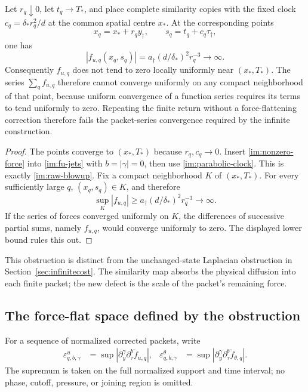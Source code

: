 \begin{proposition}\label{im:raw-obstruction}
Let $r_q\downarrow0$, let $t_q\to T_*$, and place complete similarity
copies with the fixed clock
$c_q=\delta_*r_q^2/d$ at the common spatial centre $x_*$.  At the
corresponding points
\[
 x_q=x_*+r_qy_\dagger,\qquad
 s_q=t_q+c_q\tau_\dagger,
\]
one has
\begin{equation}\label{im:raw-blowup}
 |f_{u,q}(x_q,s_q)|
 =a_\dagger(d/\delta_*)^2r_q^{-3}\longrightarrow\infty.
\end{equation}
Consequently $f_{u,q}$ does not tend to zero locally uniformly near
$(x_*,T_*)$.  The series $\sum_qf_{u,q}$ therefore cannot converge
uniformly on any compact neighborhood of that point, because uniform
convergence of a function series requires its terms to tend uniformly
to zero.  Repeating the finite return without a force-flattening
correction therefore fails the packet-series convergence required by
the infinite construction.
\end{proposition}

\begin{proof}
The points converge to $(x_*,T_*)$ because $r_q,c_q\to0$.
Insert \eqref{im:nonzero-force} into \eqref{im:fu-jets} with
$b=|\gamma|=0$, then use \eqref{im:parabolic-clock}.  This is exactly
\eqref{im:raw-blowup}.  Fix a compact neighborhood $K$ of
$(x_*,T_*)$.  For every sufficiently large $q$, $(x_q,s_q)\in K$, and
therefore
\[
 \sup_K|f_{u,q}|\geq
 a_\dagger(d/\delta_*)^2r_q^{-3}\longrightarrow\infty.
\]
If the series of forces converged uniformly on $K$, the differences of
successive partial sums, namely $f_{u,q}$, would converge uniformly to
zero.  The displayed lower bound rules this out.
\end{proof}

This obstruction is distinct from the unchanged-state Laplacian
obstruction in Section~\ref{sec:infinitecost}.  The similarity map
absorbs the physical diffusion into each finite packet; the new defect
is the scale of the packet's remaining force.

\subsection{The force-flat space defined by the obstruction}

For a sequence of normalized corrected packets, write
\begin{align}
 \varepsilon^u_{q,b,\gamma}
 &=\sup|\partial_y^\gamma\partial_\tau^b
                \widetilde f_{u,q}|,&
 \varepsilon^\theta_{q,b,\gamma}
 &=\sup|\partial_y^\gamma\partial_\tau^b
                \widetilde f_{\theta,q}|.
 \label{im:normalized-budgets}
\end{align}
The supremum is taken on the full normalized support and time interval;
no phase, cutoff, pressure, or joining region is omitted.

